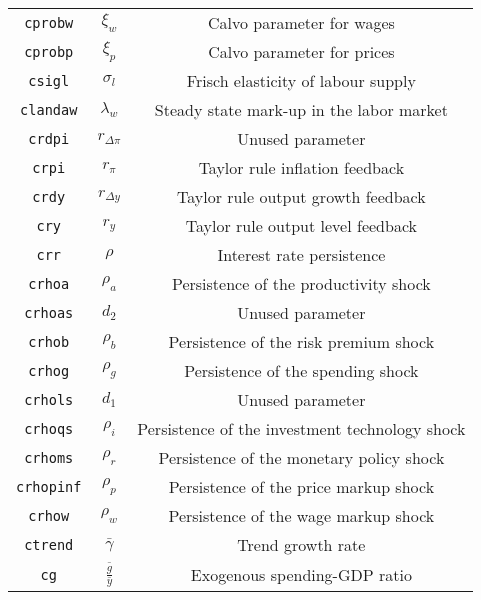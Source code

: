 \begin{center}
\begin{longtable}{ccc}
\texttt{cprobw} & ${\xi_w}$ & Calvo parameter for wages\\
\texttt{cprobp} & ${\xi_p}$ & Calvo parameter for prices\\
\texttt{csigl} & ${\sigma_l}$ & Frisch elasticity of labour supply\\
\texttt{clandaw} & ${\lambda_w}$ & Steady state mark-up in the labor market\\
\texttt{crdpi} & ${r_{\Delta \pi}}$ & Unused parameter\\
\texttt{crpi} & ${r_{\pi}}$ & Taylor rule inflation feedback\\
\texttt{crdy} & ${r_{\Delta y}}$ & Taylor rule output growth feedback\\
\texttt{cry} & ${r_{y}}$ & Taylor rule output level feedback\\
\texttt{crr} & ${\rho}$ & Interest rate persistence\\
\texttt{crhoa} & ${\rho_a}$ & Persistence of the productivity shock\\
\texttt{crhoas} & ${d_2}$ & Unused parameter\\
\texttt{crhob} & ${\rho_b}$ & Persistence of the risk premium shock\\
\texttt{crhog} & ${\rho_g}$ & Persistence of the spending shock\\
\texttt{crhols} & ${d_1}$ & Unused parameter\\
\texttt{crhoqs} & ${\rho_i}$ & Persistence of the investment technology shock\\
\texttt{crhoms} & ${\rho_r}$ & Persistence of the monetary policy shock\\
\texttt{crhopinf} & ${\rho_p}$ & Persistence of the price markup shock\\
\texttt{crhow} & ${\rho_w}$ & Persistence of the wage markup shock\\
\texttt{ctrend} & ${\bar{\gamma}}$ & Trend growth rate\\
\texttt{cg} & ${\frac{\bar g}{\bar y}}$ & Exogenous spending-GDP ratio\\
\hline%
\end{longtable}
\end{center}
